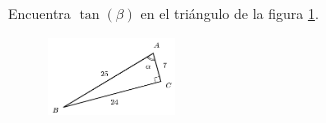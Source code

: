 Encuentra $\tan(\beta)$ en el triángulo de la figura \ref{fig:functrig16}.
\begin{figure}[H]
    \begin{center}
        \includegraphics[width=0.3\textwidth]{../images/functrig16.png}
    \end{center}
    \caption{}
    \label{fig:functrig16}
\end{figure}
